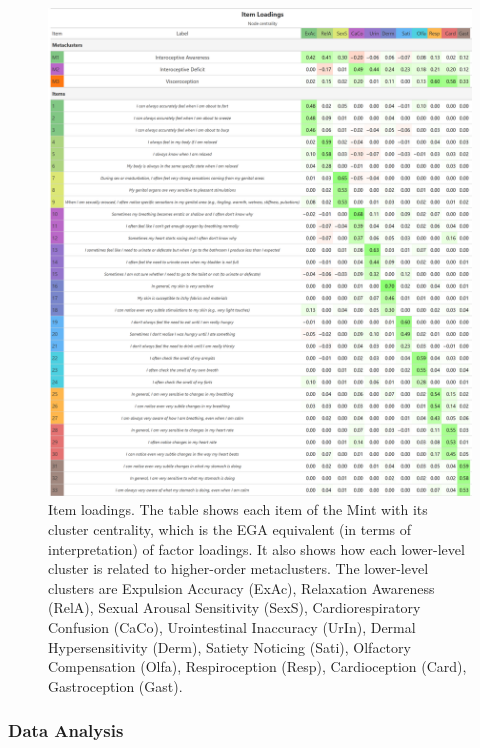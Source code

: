 \documentclass[
  jou,
  floatsintext,
  longtable,
  nolmodern,
  notxfonts,
  notimes,
  colorlinks=true,linkcolor=blue,citecolor=blue,urlcolor=blue]{apa7}
\begin{document}
\begin{figure}[!htbp]

{\caption{{Item loadings. The table shows each item of the Mint with its
cluster centrality, which is the EGA equivalent (in terms of
interpretation) of factor loadings. It also shows how each lower-level
cluster is related to higher-order metaclusters. The lower-level
clusters are Expulsion Accuracy (ExAc), Relaxation Awareness (RelA),
Sexual Arousal Sensitivity (SexS), Cardiorespiratory Confusion (CaCo),
Urointestinal Inaccuracy (UrIn), Dermal Hypersensitivity (Derm), Satiety
Noticing (Sati), Olfactory Compensation (Olfa), Respiroception (Resp),
Cardioception (Card), Gastroception (Gast).}{\label{fig-three}}}}

\begin{center}
\includegraphics[width=1\linewidth,height=\textheight,keepaspectratio]{../study2/analysis/figures/table1.png}
\end{center}

\end{figure}

\subsubsection{Data Analysis}\label{data-analysis-1}
\end{document}
